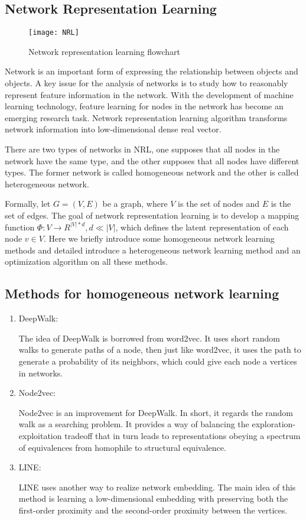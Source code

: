 \documentclass[conference]{IEEEtran}
\begin{document}
\subsection{Network Representation Learning}
\begin{figure}[h]
\centering
\texttt{[image: NRL]}
\caption{Network representation learning flowchart}
\label{fig_NRL}
\end{figure}
Network is an important form of expressing the relationship between objects and objects. A key issue for the analysis of networks is to study how to reasonably represent feature information in the network. With the development of machine learning technology, feature learning for nodes in the network has become an emerging research task. Network representation learning algorithm transforms network information into low-dimensional dense real vector. 

There are two types of networks in NRL, one supposes that all nodes in the network have the same type, and the other supposes that all nodes have different types. The former network is called homogeneous network and the other is called heterogeneous network.

Formally, let $G=(V,E)$ be a graph, where $V$ is the set of nodes and $E$ is the set of edges. The goal of network representation learning is to develop a mapping function $\Phi:V\rightarrow R^{|V|*d},d\ll|V|$, which defines the latent representation of each node $v\in V$. Here we briefly introduce some homogeneous network learning methods and detailed introduce a heterogeneous network learning method and an optimization algorithm on all these methods.
\subsection*{Methods for homogeneous network learning}
\begin{enumerate}
	\item DeepWalk:
	
	The idea of DeepWalk\cite{Perozzi:2014:DOL:2623330.2623732} is borrowed from word2vec. It uses short random walks to generate paths of a node, then just like word2vec, it uses the path to generate a probability of its neighbors, which could give each node a vertices in networks.
		\item Node2vec:
		
		Node2vec\cite{DBLP:journals/corr/GroverL16} is an improvement for DeepWalk. In short, it regards the random walk as a searching problem. It provides a way of balancing the exploration-exploitation tradeoff that in turn leads to representations obeying a spectrum of equivalences from homophile to structural equivalence.
	\item LINE:
	
	LINE\cite{tang2015line} uses another way to realize network embedding. The main idea of this method is learning a low-dimensional embedding with preserving both the first-order proximity and the second-order proximity between the vertices.
\end{enumerate}
\end{document}

